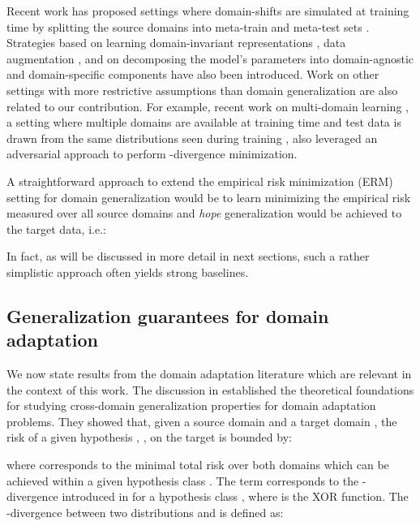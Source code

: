 \documentclass{article}
\begin{document}
Recent work has proposed settings where domain-shifts are simulated at training time by splitting the source domains into meta-train and meta-test sets \cite{li2018learning,balaji2018metareg,dou2019domain,li2019episodic}. Strategies based on learning domain-invariant representations \cite{muandet2013domain}, data augmentation \cite{volpi2018generalizing,shankar2018generalizing}, and on decomposing the model's parameters into domain-agnostic and domain-specific components \cite{li2017deeper} have also been introduced. Work on other settings with more restrictive assumptions than domain generalization are also related to our contribution. For example, recent work on multi-domain learning \cite{schoenauer2019multi}, a setting where multiple domains are available at training time and test data is drawn from the same distributions seen during training \cite{dredze2010multi}, also leveraged an adversarial approach to perform -divergence minimization.



A straightforward approach to extend the empirical risk minimization (ERM) setting for domain generalization would be to learn  minimizing the empirical risk  measured over all  source domains and \textit{hope} generalization would be achieved to the target data, i.e.:

In fact, as will be discussed in more detail in next sections, such a rather simplistic approach often yields strong baselines.









\subsection{Generalization guarantees for domain adaptation} 
We now state results from the domain adaptation literature which are relevant in the context of this work. 
The discussion in \cite{ben2010theory} established the theoretical foundations for studying cross-domain generalization properties for domain adaptation problems. They showed that, given a source domain  and a target domain , the risk of a given hypothesis , , on the target is bounded by:

where  corresponds to the minimal total risk over both domains which can be achieved within a given hypothesis class . The term  corresponds to the -divergence introduced in \cite{kifer2004detecting} for a hypothesis class , where  is the XOR function. The -divergence between two distributions   and  is defined as: 
\end{document}
